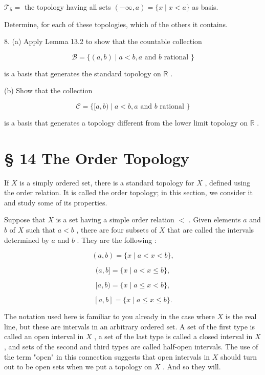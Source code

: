 \({\mathcal{T}}_{5} =\) the topology having all sets \(\left( {-\infty ,a}\right)  = \{ x \mid  x < a\}\) as basis.

Determine, for each of these topologies, which of the others it contains.

8. (a) Apply Lemma 13.2 to show that the countable collection

\[
\mathcal{B} = \{ \left( {a,b}\right)  \mid  a < b,a\text{ and }b\text{ rational }\}
\]

is a basis that generates the standard topology on \(\mathbb{R}\) .

(b) Show that the collection

\[
\mathcal{C} = \{ \lbrack a,b) \mid  a < b,a\text{ and }b\text{ rational }\}
\]

is a basis that generates a topology different from the lower limit topology on \(\mathbb{R}\) .

\section*{§ 14 The Order Topology}

If \(X\) is a simply ordered set, there is a standard topology for \(X\) , defined using the order relation. It is called the order topology; in this section, we consider it and study some of its properties.

Suppose that \(X\) is a set having a simple order relation \(<\) . Given elements \(a\) and \(b\) of \(X\) such that \(a < b\) , there are four subsets of \(X\) that are called the intervals determined by \(a\) and \(b\) . They are the following :

\[
\left( {a,b}\right)  = \{ x \mid  a < x < b\} ,
\]

\[
(a,b\rbrack  = \{ x \mid  a < x \leq  b\} ,
\]

\[
\lbrack a,b) = \{ x \mid  a \leq  x < b\} ,
\]

\[
\left\lbrack  {a,b}\right\rbrack   = \{ x \mid  a \leq  x \leq  b\} .
\]

The notation used here is familiar to you already in the case where \(X\) is the real line, but these are intervals in an arbitrary ordered set. A set of the first type is called an open interval in \(X\) , a set of the last type is called a closed interval in \(X\) , and sets of the second and third types are called half-open intervals. The use of the term "open" in this connection suggests that open intervals in \(X\) should turn out to be open sets when we put a topology on \(X\) . And so they will.

